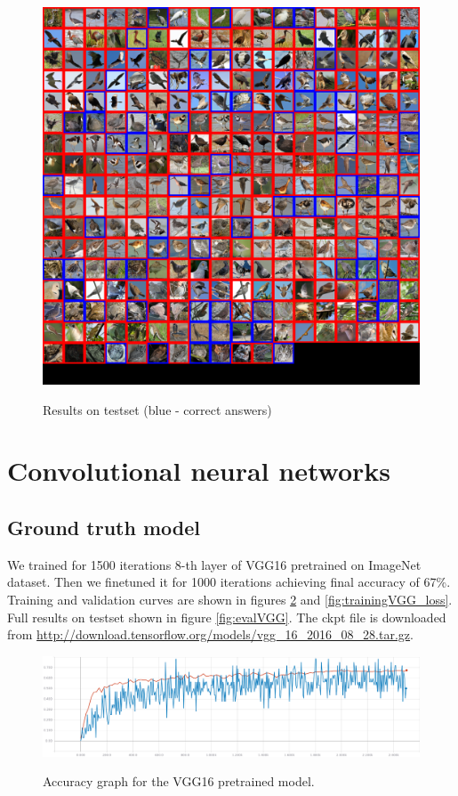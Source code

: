 \documentclass[a4paper]{article}
\begin{document}
\begin{figure}[H]
    \caption[]{Results on testset (blue - correct answers)}
    \centering
    \includegraphics[page=2,width=1.0\textwidth]{eval.png}
    \label{fig:eval}
\end{figure}

\newpage
\section{Convolutional neural networks}

\subsection{Ground truth model}

We trained for 1500 iterations 8-th layer of VGG16\cite{VGG16}
pretrained on ImageNet\cite{ImageNet} dataset.
Then we finetuned it for 1000 iterations achieving final accuracy of 67\%.
Training and validation curves are shown in figures \ref{fig:trainingVGG_accuracy} and \ref{fig:trainingVGG_loss}.
Full results on testset shown in figure \ref{fig:evalVGG}.
The ckpt file is downloaded from \url{http://download.tensorflow.org/models/vgg_16_2016_08_28.tar.gz}.

\begin{figure}[h]
    \caption[]{Accuracy graph for the VGG16 pretrained model.}
    \centering
    \includegraphics[page=2,width=1.0\textwidth]{vggTraining_accuracy.png}
    \label{fig:trainingVGG_accuracy}
\end{figure}
\end{document}

